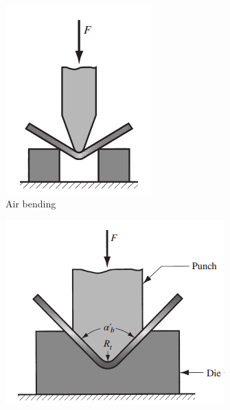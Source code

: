 \begin{figure}[h]
    \begin{tcolorbox}[arc=0pt,boxrule=0.5pt, colback=white]
        \centering
        \begin{subfigure}{0.3\textwidth}
            \centering
            \includegraphics[width=\textwidth]{chap3/images/air-bending}
            \caption{Air bending}
            \label{fig:air-bending}
        \end{subfigure}
        \hfill
        \begin{subfigure}{0.3\textwidth}
            \includegraphics[width=\textwidth]{chap3/images/v-bending}

\end{subfigure}
\end{tcolorbox}
\end{figure}
